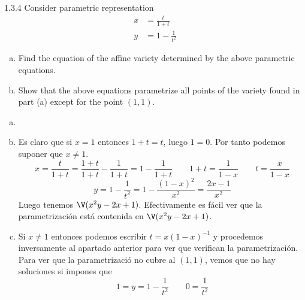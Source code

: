 \documentclass[twoside]{article}
\begin{document}
\begin{ejercicio}{1.3.4}
Consider parametric representation
\begin{align*}
x&=\frac{t}{1+t}\\
y&=1-\frac{1}{t^2}
\end{align*}
\begin{enumerate}[a)]
\item Find the equation of the affine variety determined by the above parametric equations.
\item Show that the above equations parametrize all points of the variety found in part
(a) except for the point $(1, 1)$.
\end{enumerate}
\end{ejercicio}
\begin{solucion}
\begin{enumerate}[a)]
\item[]
\item Es claro que si $x=1$ entonces $1+t=t$, luego $1=0$. Por tanto podemos suponer que $x\neq 1$.
$$
x=\frac{t}{1+t} = \frac{1+t}{1+t}-\frac{1}{1+t} = 1 -\frac{1}{1+t}\qquad 1+t= \frac{1}{1-x} \qquad
t = \frac{x}{1-x}
$$
$$
y = 1-\frac{1}{t^2} = 1 - \frac{(1-x)^2}{x^2} = \frac{2x-1}{x^2}
$$
Luego tenemos $\V(x^2y-2x+1)$. Efectivamente es fácil ver que la parametrización está contenida en $\V(x^2y-2x+1)$. \item Si $x\neq 1$ entonces podemos escribir 
$t=x(1-x)^{-1}$ y procedemos inversamente al apartado anterior para ver que verifican la parametrización. Para ver que la parametrizació no cubre al $(1,1)$, vemos que no hay soluciones si impones que
$$
1=y=1-\frac{1}{t^2} \qquad 0 = \frac{1}{t^2}
$$
\end{enumerate}
\end{solucion}

\newpage
\end{document}
